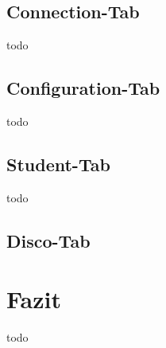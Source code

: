\subsection{Connection-Tab}
todo
\subsection{Configuration-Tab}
todo
\subsection{Student-Tab}
todo
\subsection{Disco-Tab}

\section{Fazit}
todo

